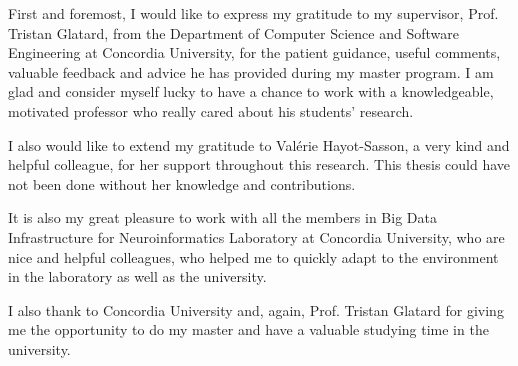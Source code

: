 \begin{acknowledgments}

First and foremost, I would like to express my gratitude to my supervisor, 
Prof. Tristan Glatard, from the Department of Computer Science and 
Software Engineering at Concordia University, for the patient guidance, 
useful comments, valuable feedback and advice he has provided 
during my master program. 
I am glad and consider myself lucky to have a chance to work 
with a knowledgeable, motivated professor who really cared about 
his students' research. 

I also would like to extend my gratitude to Val\'erie Hayot-Sasson, 
a very kind and helpful colleague, for her support throughout this research. 
This thesis could have not been done without her knowledge and contributions. 

It is also my great pleasure to work with all the members in Big Data 
Infrastructure for Neuroinformatics Laboratory at Concordia University, 
who are nice and helpful colleagues, who helped me to quickly adapt to 
the environment in the laboratory as well as the university. 

I also thank to Concordia University and, again, Prof. Tristan Glatard for 
giving me the opportunity to do my master and have a valuable 
studying time in the university.

\end{acknowledgments}